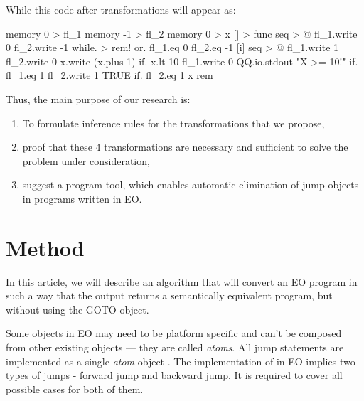\documentclass[sigplan,review,11pt,nonacm,natbib=false]{acmart}
\theoremstyle{theorems}
\newcounter{rule}
\begin{document}
While this code after transformations will appear as:
\begin{ffcode}
memory 0 > fl_1
memory -1 > fl_2
memory 0 > x
[] > func
  seq > @
    fl_1.write 0
    fl_2.write -1
    while. > rem!
      or.
        fl_1.eq 0
        fl_2.eq -1
      [i]
        seq > @
          fl_1.write 1
          fl_2.write 0
          x.write (x.plus 1)
          if.
            x.lt 10
            fl_1.write 0
            QQ.io.stdout "X >= 10!\n"
          if.
            fl_1.eq 1
            fl_2.write 1
            TRUE
    if.
      fl_2.eq 1
      x
      rem
\end{ffcode}

Thus, the main purpose of our research is:
\begin{enumerate}
    \item To formulate inference rules for the transformations that we propose,
    \item proof that these 4 transformations are necessary and sufficient to solve the problem under consideration,
    \item suggest a program tool, which
    enables automatic elimination of jump objects in programs written in EO.
\end{enumerate}



\section{Method}
In this article, we will describe an algorithm that will convert an EO program in such a way that the output returns a semantically equivalent program, but without using the GOTO object.

Some objects in EO may need to be platform specific and can’t be composed from other existing objects — they are called \emph{atoms}. 
All jump statements are implemented as a
single \emph{atom}-object .
The implementation of  in EO implies two types of jumps - forward jump and backward jump.
It is required to cover all possible cases for both of them.
\end{document}
